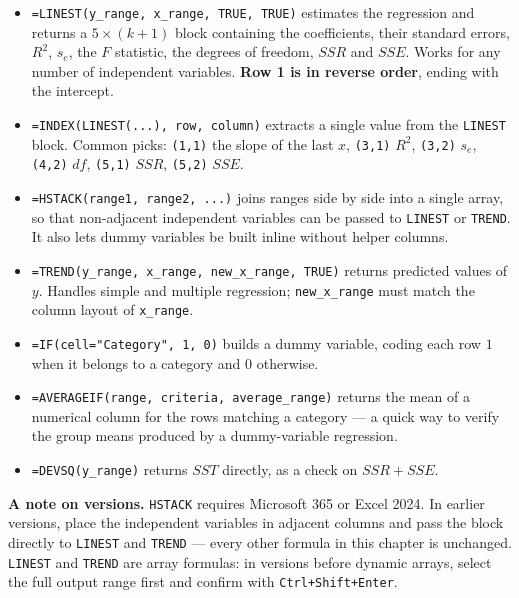 \documentclass[
  11pt,
  letterpaper,
  DIV=11,
  numbers=noendperiod,
  oneside,
  open=any]{scrreprt}
\begin{document}
\begin{itemize}
\item
  \texttt{=LINEST(y\_range,\ x\_range,\ TRUE,\ TRUE)} estimates the
  regression and returns a \(5 \times (k+1)\) block containing the
  coefficients, their standard errors, \(R^2\), \(s_e\), the \(F\)
  statistic, the degrees of freedom, \(SSR\) and \(SSE\). Works for any
  number of independent variables. \textbf{Row 1 is in reverse order},
  ending with the intercept.
\item
  \texttt{=INDEX(LINEST(...),\ row,\ column)} extracts a single value
  from the \texttt{LINEST} block. Common picks: \texttt{(1,1)} the slope
  of the last \(x\), \texttt{(3,1)} \(R^2\), \texttt{(3,2)} \(s_e\),
  \texttt{(4,2)} \(df\), \texttt{(5,1)} \(SSR\), \texttt{(5,2)} \(SSE\).
\item
  \texttt{=HSTACK(range1,\ range2,\ ...)} joins ranges side by side into
  a single array, so that non-adjacent independent variables can be
  passed to \texttt{LINEST} or \texttt{TREND}. It also lets dummy
  variables be built inline without helper columns.
\item
  \texttt{=TREND(y\_range,\ x\_range,\ new\_x\_range,\ TRUE)} returns
  predicted values of \(y\). Handles simple and multiple regression;
  \texttt{new\_x\_range} must match the column layout of
  \texttt{x\_range}.
\item
  \texttt{=IF(cell="Category",\ 1,\ 0)} builds a dummy variable, coding
  each row \(1\) when it belongs to a category and \(0\) otherwise.
\item
  \texttt{=AVERAGEIF(range,\ criteria,\ average\_range)} returns the
  mean of a numerical column for the rows matching a category --- a
  quick way to verify the group means produced by a dummy-variable
  regression.
\item
  \texttt{=DEVSQ(y\_range)} returns \(SST\) directly, as a check on
  \(SSR+SSE\).
\end{itemize}

\begin{tcolorbox}[enhanced jigsaw, breakable, left=2mm, title=\textcolor{quarto-callout-note-color}{\faInfo}\hspace{0.5em}{Note}, coltitle=black, colframe=quarto-callout-note-color-frame, rightrule=.15mm, toprule=.15mm, arc=.35mm, opacityback=0, titlerule=0mm, bottomtitle=1mm, toptitle=1mm, colback=white, colbacktitle=quarto-callout-note-color!10!white, opacitybacktitle=0.6, leftrule=.75mm, bottomrule=.15mm]

\textbf{A note on versions.} \texttt{HSTACK} requires Microsoft 365 or
Excel 2024. In earlier versions, place the independent variables in
adjacent columns and pass the block directly to \texttt{LINEST} and
\texttt{TREND} --- every other formula in this chapter is unchanged.
\texttt{LINEST} and \texttt{TREND} are array formulas: in versions
before dynamic arrays, select the full output range first and confirm
with \texttt{Ctrl+Shift+Enter}.

\end{tcolorbox}
\end{document}
